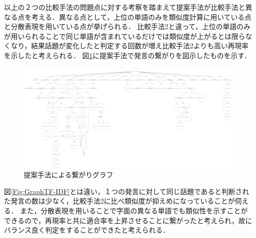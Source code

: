 以上の２つの比較手法の問題点に対する考察を踏まえて提案手法が比較手法と異なる点を考える．異なる点として，上位の単語のみを類似度計算に用いている点と分散表現を用いている点が挙げられる．
比較手法2と違って，上位の単語のみが用いられることで同じ単語が含まれているだけでは類似度が上がるとは限らなくなり，結果話題が変化したと判定する回数が増え比較手法2よりも高い再現率を示したと考えられる．
図\ref{Fig:GraphFastText}に提案手法で発言の繋がりを図示したものを示す．
\begin{figure}[htbp]
 \begin{center}
  \includegraphics[width=1.1\textwidth]{../images/5.Experiment/Graph=FastText-min.png}
  \caption{提案手法による繋がりグラフ}
  \label{Fig:GraphFastText}
  \vspace{-10pt}
 \end{center}
\end{figure}

図\ref{Fig:GraphTF-IDF}とは違い，１つの発言に対して同じ話題であると判断された発言の数は少なく，比較手法2に比べ類似度が抑えめになっていることが伺える．
また，分散表現を用いることで字面の異なる単語でも類似性を示すことができるので，再現率と共に適合率を上昇させることに繋がったと考えられ，故にバランス良く判定をすることができたと考えられる．

